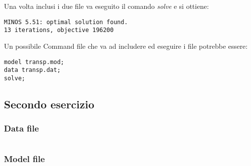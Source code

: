 \documentclass[\main/main.tex]{subfiles}
\begin{document}
Una volta inclusi i due file va eseguito il comando \textit{solve} e si ottiene:

\begin{verbatim}
MINOS 5.51: optimal solution found.
13 iterations, objective 196200
\end{verbatim}

Un possibile Command file che va ad includere ed eseguire i file potrebbe essere:

\begin{verbatim}
model transp.mod;
data transp.dat;
solve;
\end{verbatim}

\subsection{Secondo esercizio}
\subsubsection{Data file}
\inputminted{ampl}{\main/chapters/ampl/multi/multi.dat}
\subsubsection{Model file}
\inputminted{ampl}{\main/chapters/ampl/multi/multi.mod}
\end{document}
